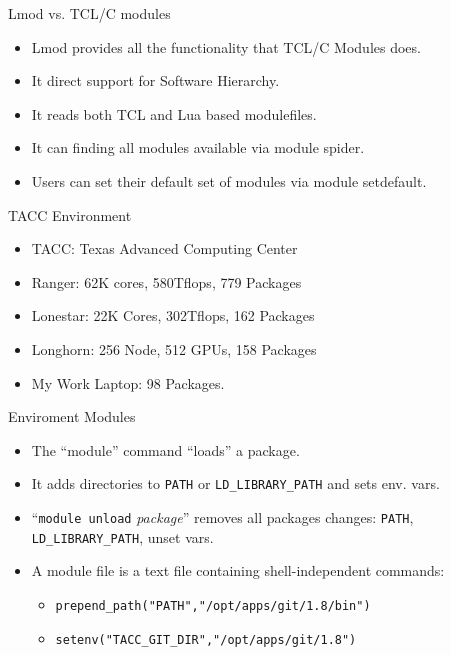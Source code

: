 \documentclass{beamer}
\begin{document}
\begin{frame}{Lmod vs. TCL/C modules}

  \begin{itemize}
    \item Lmod provides all the functionality that TCL/C Modules does.
    \item It direct support for Software Hierarchy.
    \item It reads both TCL and Lua based modulefiles.
    \item It can finding all modules available via {\color{blue}module spider}.
    \item Users can set their default set of modules via
      {\color{blue}module  setdefault}.
  \end{itemize}
\end{frame}



\begin{frame}{TACC Environment}
  \begin{itemize}
    \item TACC: Texas Advanced Computing Center
    \item Ranger: 62K cores, 580Tflops, 779 Packages
    \item Lonestar: 22K Cores, 302Tflops, 162 Packages
    \item Longhorn: 256 Node, 512 GPUs, 158 Packages
    \item My Work Laptop: 98 Packages.
  \end{itemize}
\end{frame}

\begin{frame}{Enviroment Modules }
  \begin{itemize}
    \item The ``module'' command ``loads'' a package.
    \item It adds directories to \texttt{PATH} or \texttt{LD\_LIBRARY\_PATH} and
      sets env. vars.
    \item ``\texttt{module unload} \emph{package}'' removes all packages
      changes: \texttt{PATH}, \texttt{LD\_LIBRARY\_PATH}, unset vars.
    \item A module file is a text file containing shell-independent commands:
      \begin{itemize}
        \item \texttt{prepend\_path("PATH","/opt/apps/git/1.8/bin")}
        \item \texttt{setenv("TACC\_GIT\_DIR","/opt/apps/git/1.8")}
      \end{itemize}
  \end{itemize}
\end{frame}
\end{document}
